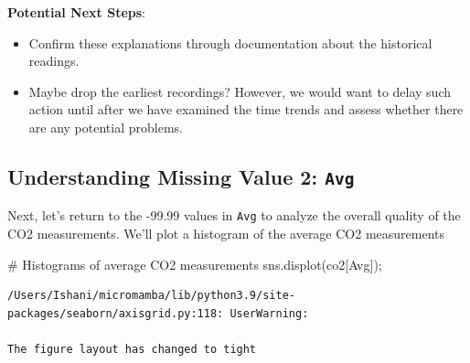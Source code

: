\documentclass[
  letterpaper,
  DIV=11,
  numbers=noendperiod]{scrreprt}
\newenvironment{Shaded}{\begin{snugshade}}{\end{snugshade}}
\newcommand{\CommentTok}[1]{\textcolor[rgb]{0.37,0.37,0.37}{#1}}
\newcommand{\NormalTok}[1]{\textcolor[rgb]{0.00,0.23,0.31}{#1}}
\newcommand{\OperatorTok}[1]{\textcolor[rgb]{0.37,0.37,0.37}{#1}}
\newcommand{\StringTok}[1]{\textcolor[rgb]{0.13,0.47,0.30}{#1}}
\providecommand{\tightlist}{%
  \setlength{\itemsep}{0pt}\setlength{\parskip}{0pt}}\usepackage{longtable,booktabs,array}
\begin{document}
\textbf{Potential Next Steps}:

\begin{itemize}
\tightlist
\item
  Confirm these explanations through documentation about the historical
  readings.
\item
  Maybe drop the earliest recordings? However, we would want to delay
  such action until after we have examined the time trends and assess
  whether there are any potential problems.
\end{itemize}

\hypertarget{understanding-missing-value-2-avg}{%
\subsection{\texorpdfstring{Understanding Missing Value 2:
\texttt{Avg}}{Understanding Missing Value 2: Avg}}\label{understanding-missing-value-2-avg}}

Next, let's return to the -99.99 values in \texttt{Avg} to analyze the
overall quality of the CO2 measurements. We'll plot a histogram of the
average CO2 measurements

\begin{Shaded}
\begin{Highlighting}[]
\CommentTok{\# Histograms of average CO2 measurements}
\NormalTok{sns.displot(co2[}\StringTok{\textquotesingle{}Avg\textquotesingle{}}\NormalTok{])}\OperatorTok{;}
\end{Highlighting}
\end{Shaded}

\begin{verbatim}
/Users/Ishani/micromamba/lib/python3.9/site-packages/seaborn/axisgrid.py:118: UserWarning:

The figure layout has changed to tight
\end{verbatim}
\end{document}
